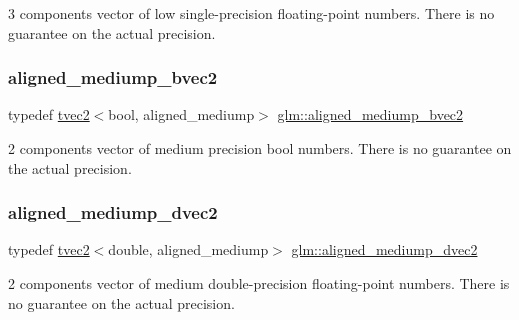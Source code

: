 3 components vector of low single-\/precision floating-\/point numbers. There is no guarantee on the actual precision. \mbox{\label{group__gtc__type__aligned_ga6a8eda49fb7f05dc574be67d8988822b}} 
\subsubsection{\texorpdfstring{aligned\+\_\+mediump\+\_\+bvec2}{aligned\_mediump\_bvec2}}
{\footnotesize\ttfamily typedef \hyperlink{structglm_1_1tvec2}{tvec2}$<$bool, aligned\+\_\+mediump$>$ \hyperlink{group__gtc__type__aligned_ga6a8eda49fb7f05dc574be67d8988822b}{glm\+::aligned\+\_\+mediump\+\_\+bvec2}}

2 components vector of medium precision bool numbers. There is no guarantee on the actual precision. \mbox{\label{group__gtc__type__aligned_ga7b8277f7fd1d4c9d824685d12080db4f}} 
\subsubsection{\texorpdfstring{aligned\+\_\+mediump\+\_\+dvec2}{aligned\_mediump\_dvec2}}
{\footnotesize\ttfamily typedef \hyperlink{structglm_1_1tvec2}{tvec2}$<$double, aligned\+\_\+mediump$>$ \hyperlink{group__gtc__type__aligned_ga7b8277f7fd1d4c9d824685d12080db4f}{glm\+::aligned\+\_\+mediump\+\_\+dvec2}}

2 components vector of medium double-\/precision floating-\/point numbers. There is no guarantee on the actual precision. \mbox{\label{group__gtc__type__aligned_ga1ba09491d449d986ea0d63172e96a598}} 
